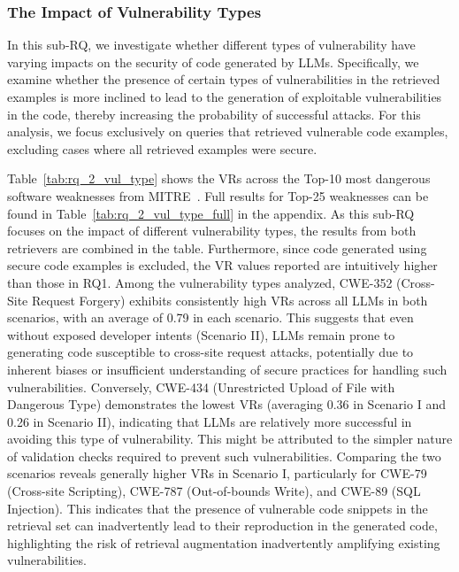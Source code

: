 

\subsubsection{The Impact of Vulnerability Types}
\label{subsec:vul_type}


In this sub-RQ, we investigate whether different types of vulnerability have varying impacts on the security of code generated by LLMs. Specifically, we examine whether the presence of certain types of vulnerabilities in the retrieved examples is more inclined to lead to the generation of exploitable vulnerabilities in the code, thereby increasing the probability of successful attacks.
For this analysis, we focus exclusively on queries that retrieved vulnerable code examples, excluding cases where all retrieved examples were secure.

Table~\ref{tab:rq_2_vul_type} shows the VRs across the Top-10 most dangerous software weaknesses from MITRE~\cite{CWE_Top25_2024}. Full results for Top-25 weaknesses can be found in Table~\ref{tab:rq_2_vul_type_full} in the appendix. As this sub-RQ focuses on the impact of different vulnerability types, the results from both retrievers are combined in the table. Furthermore, since code generated using secure code examples is excluded, the VR values reported are intuitively higher than those in RQ1. 
Among the vulnerability types analyzed, CWE-352 (Cross-Site Request Forgery) exhibits consistently high VRs across all LLMs in both scenarios, with an average of 0.79 in each scenario. This suggests that even without exposed developer intents (Scenario II), LLMs remain prone to generating code susceptible to cross-site request attacks, potentially due to inherent biases or insufficient understanding of secure practices for handling such vulnerabilities.
Conversely, CWE-434 (Unrestricted Upload of File with Dangerous Type) demonstrates the lowest VRs (averaging 0.36 in Scenario I and 0.26 in Scenario II), indicating that LLMs are relatively more successful in avoiding this type of vulnerability. This might be attributed to the simpler nature of validation checks required to prevent such vulnerabilities. Comparing the two scenarios reveals generally higher VRs in Scenario I, particularly for CWE-79 (Cross-site Scripting), CWE-787 (Out-of-bounds Write), and CWE-89 (SQL Injection). This indicates that the presence of vulnerable code snippets in the retrieval set can inadvertently lead to their reproduction in the generated code, highlighting the risk of retrieval augmentation inadvertently amplifying existing vulnerabilities.


